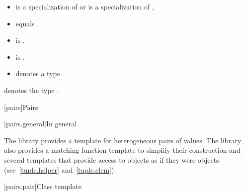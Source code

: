 \documentclass{wg21}
\begin{document}
\begin{addedblock}
\begin{itemdescr}
\constraints
\begin{itemize}
    \item {} is a specialization of  or  is a specialization of ,
    \item {} equals .
    \item {} is .
    \item {} is .
    \item {} denotes a type.
\end{itemize}

 denotes the type .

\end{itemdescr}
\end{addedblock}


[pairs]{Pairs}

[pairs.general]{In general}

\pnum
The library provides a template for heterogeneous pairs of values.
The library also provides a matching function template to simplify
their construction and several templates that provide access to 
objects as if they were  objects (see~\ref{tuple.helper}
and~\ref{tuple.elem}).%
%
%
%

[pairs.pair]{Class template }
\end{document}
